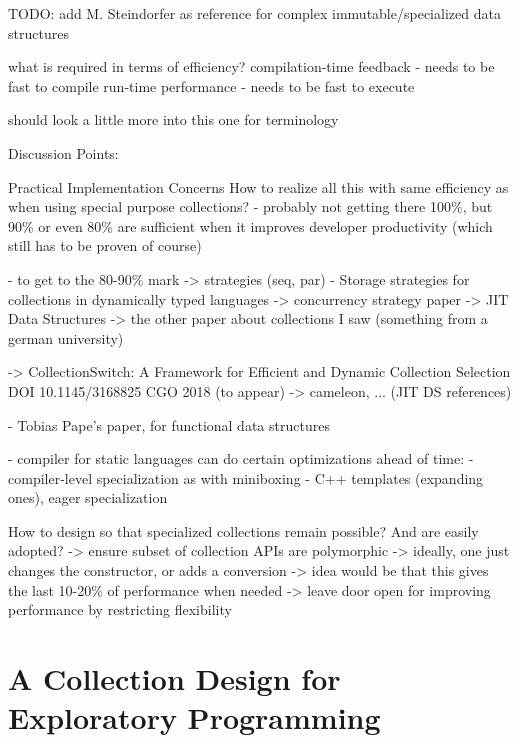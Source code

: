 \documentclass[sigconf, 10pt]{acmart}
\begin{document}
\begin{note}
  TODO: add M. Steindorfer as reference for complex immutable/specialized data structures \citep{Steindorfer:2015:OHM}
  
  
  what is required in terms of efficiency?
  compilation-time feedback - needs to be fast to compile
  run-time performance - needs to be fast to execute

  \citep{Rein:2016:LLP} should look a little more into this one for terminology
  
Discussion Points:
 
Practical Implementation Concerns
 How to realize all this with same efficiency as when using special purpose
 collections?
 - probably not getting there 100\%, but 90\% or even 80\% are sufficient
   when it improves developer productivity (which still has to be proven of course)
  
 - to get to the 80-90\% mark
  -> strategies (seq, par)
   - Storage strategies for collections in dynamically typed languages \citep{Bolz:2013:SSC}
   -> concurrency strategy paper
  -> JIT Data Structures
     -> the other paper about collections I saw (something from a german university)

  -> CollectionSwitch: A Framework for Efficient and Dynamic Collection Selection
DOI 10.1145/3168825
CGO 2018 (to appear)
  -> cameleon, ... (JIT DS references)

- Tobias Pape's paper, for functional data structures


- compiler for static languages can do certain optimizations ahead of time:
  - compiler-level specialization as with miniboxing \citep{Ureche:2013:MIS}
  - C++ templates (expanding ones), eager specialization

How to design so that specialized collections remain possible?
And are easily adopted?
 -> ensure subset of collection APIs are polymorphic
   -> ideally, one just changes the constructor, or adds a conversion
   -> idea would be that this gives the last 10-20\% of performance when needed
   -> leave door open for improving performance by restricting flexibility
\end{note}


\section{A Collection Design for Exploratory Programming}
\end{document}
